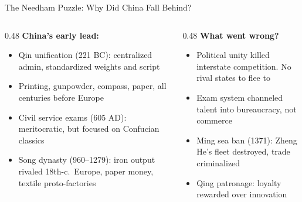 \documentclass[aspectratio=169, 11pt]{beamer}
\begin{document}
\begin{frame}{The Needham Puzzle: Why Did China Fall Behind?}
    \begin{columns}[T]
        \begin{column}{0.48\textwidth}
            \textbf{China's early lead:}
            \begin{itemize}
                \item Qin unification (221 BC): centralized admin, standardized weights and script
                \item Printing, gunpowder, compass, paper, all centuries before Europe
                \item Civil service exams (605 AD): meritocratic, but focused on Confucian classics
                \item Song dynasty (960--1279): iron output rivaled 18th-c.\ Europe, paper money, textile proto-factories
            \end{itemize}
        \end{column}
        \begin{column}{0.48\textwidth}
            \textbf{What went wrong?}
            \begin{itemize}
                \item \alert{Political unity} killed interstate competition. No rival states to flee to
                \item Exam system channeled talent into bureaucracy, not commerce
                \item Ming sea ban (1371): Zheng He's fleet destroyed, trade criminalized
                \item Qing patronage: loyalty rewarded over innovation
            \end{itemize}
        \end{column}
    \end{columns}
\end{frame}
\end{document}
